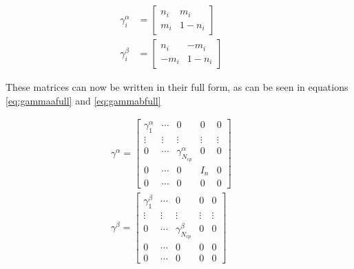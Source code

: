 \documentclass[twoside,twocolumn,9pt]{article}
\begin{document}
\begin{subequations}
  \begin{align}
    \label{eq:gammaa}
    \gamma^\alpha_i & = \begin{bmatrix}
      n_i & m_i    \\
      m_i & 1- n_i
    \end{bmatrix} &  & \\
    \label{eq:gammab}
    \gamma^\beta_i  & = \begin{bmatrix}
      n_i  & -m_i  \\
      -m_i & 1-n_i
    \end{bmatrix} &  &
  \end{align}
\end{subequations}

These matrices can now be written in their full form, as can be seen in equations \eqref{eq:gammaafull} and \eqref{eq:gammabfull}

\begin{subequations}
  \begin{align}
    \label{eq:gammaafull}
    \gamma^\alpha = \begin{bmatrix}
      \gamma^\alpha_1 & \cdots & 0                      & 0      & 0      \\
      \vdots          & \vdots & \vdots                 & \vdots & \vdots \\
      0               & \cdots & \gamma^\alpha_{N_{cp}} & 0      & 0      \\
      0               & \cdots & 0                      & I_n    & 0      \\
      0               & \cdots & 0                      & 0      & 0
    \end{bmatrix} &  & \\
    \label{eq:gammabfull}
    \gamma^\beta = \begin{bmatrix}
      \gamma^\beta_1 & \cdots & 0                     & 0      & 0      \\
      \vdots         & \vdots & \vdots                & \vdots & \vdots \\
      0              & \cdots & \gamma^\beta_{N_{cp}} & 0      & 0      \\
      0              & \cdots & 0                     & 0      & 0      \\
      0              & \cdots & 0                     & 0      & 0
    \end{bmatrix}  &  &
  \end{align}
\end{subequations}
\end{document}
